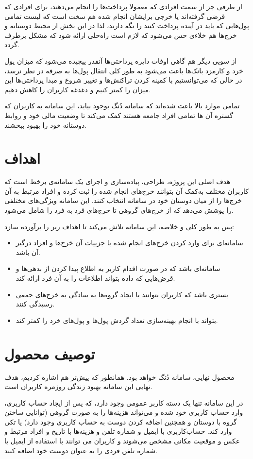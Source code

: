 از طرفی جز از سمت افرادی که معمولا پرداخت‌ها را انجام می‌دهند، برای افرادی که قرضی گرفته‌اند یا خرجی برایشان انجام شده هم سخت است که لیست تمامی پول‌هایی که باید در آینده پرداخت کنند را نگه‌ دارند، لذا در این بخش از محیط دوستانه و خرج‌ها هم خلاءی حس می‌شود که لازم است راه‌حلی ارائه شود که مشکل برطرف گردد.

از سویی دیگر هم گاهی اوقات دایره پرداختی‌ها آنقدر پیچیده می‌شود که میزان پول خرد و کارمزد بانک‌ها باعث می‌شود به طور کلی انتقال پول‌ها به صرفه در نظر نرسد، در حالی که می‌توانستیم با کمینه کردن تراکنش‌ها و تغییر شروع و مبدا پرداختی‌ها این میزان را کمتر کنیم و دغدغه کاربران را کاهش دهیم.

تمامی موارد بالا باعث شده‌اند که سامانه دُنگ بوجود بیاید، این سامانه به کاربران که گستره آن ها تمامی افراد جامعه هستند کمک می‌کند تا وضعیت مالی خود و روابط دوستانه خود را بهبود ببخشند.


\section{اهداف}
هدف اصلی این پروژه، طراحی، پیاده‌سازی و اجرای یک سامانه‌ی برخط است که کاربران مختلف به‌کمک آن بتوانند خرج‌های انجام شده را ثبت کرده و افراد مرتبط به آن‌ خرج‌ها را از میان دوستان خود در سامانه انتخاب کنند. این سامانه ویژگی‌های مختلفی را پوشش می‌دهد که از خرج‌های گروهی تا خرج‌های فرد به فرد را شامل می‌شود.

پس به طور کلی و خلاصه، این سامانه تلاش می‌کند تا اهداف زیر را برآورده سازد:
\begin{itemize}
	\item
	سامانه‌ای برای وارد کردن خرج‌های انجام شده با جزییات آن خرج‌ها و افراد درگیر آن باشد.
	\item 
	سامانه‌ای باشد که در صورت اقدام کاربر به اطلاع پیدا کردن از بدهی‌ها و قرض‌هایی که داده بتواند اطلاعات را به آن فرد ارائه کند.
	\item 
	بستری باشد که کاربران بتوانند با ایجاد گروه‌ها به سادگی به خرج‌های جمعی رسیدگی کنند.
	\item
	بتواند با انجام بهینه‌سازی تعداد گردش پول‌ها و پول‌های خرد را کمتر کند.
\end{itemize}

\section{توصیف محصول}
محصول نهایی، سامانه دُنگ خواهد بود. همانطور که پیش‌تر هم اشاره کردیم، هدف نهایی این سامانه بهبود زندگی روزمره کاربران است.

در این سامانه تنها یک دسته کاربر عمومی وجود دارد، که پس از ایجاد حساب کاربری، وارد حساب کاربری خود شده و می‌تواند هزینه‌ها را به صورت گروهی (توانایی ساختن گروه با دوستان و همچنین اضافه کردن دوست به حساب کاربری وجود دارد) یا تکی وارد کند. حساب‌کاربری با ایمیل و شماره تلفن و هزینه‌ها با تاریخ و افراد مرتبط و عکس و موقعیت مکانی مشخص می‌شوند و کاربران می توانند با استفاده از ایمیل یا شماره تلفن فردی را به عنوان دوست خود اضافه کنند.

